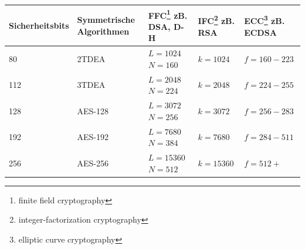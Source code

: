 \begin{center}
	\begin{tabular}{ |p{2.5cm}|p{2.5cm}|p{2.5cm}|p{2.5cm}|p{2.5cm}| }
		\hline
		Sicherheitsbits & Symmetrische \newline Algorithmen & FFC\footnote{finite field cryptography} \newline zB. DSA, D-H  &  IFC\footnote{integer-factorization cryptography} \newline zB. RSA & ECC\footnote{elliptic curve cryptography} \newline zB. ECDSA\\
		\hline
		\hline
		80 & 2TDEA    & $L = 1024$ \newline $N = 160$  & $k = 1024$  & $f = 160-223$ \\
		\hline
		112 & 3TDEA   & $L = 2048$ \newline $N = 224$  & $k = 2048$  & $f = 224-255$ \\
		\hline
		128 & AES-128 & $L = 3072$ \newline $N = 256$  & $k = 3072$  & $f = 256-283$ \\
		\hline
		192 & AES-192 & $L = 7680$ \newline $N = 384$  & $k = 7680$  & $f = 284-511$ \\
		\hline
		256 & AES-256 & $L = 15360$ \newline $N = 512$ & $k = 15360$ & $f = 512+$ \\
		\hline
	\end{tabular}
\end{center}

